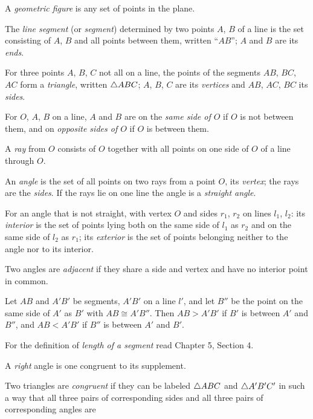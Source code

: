 \documentclass[11pt]{book}
\begin{document}
\begin{applist}
\item A \emph{geometric figure} is any set of points in the plane.
\item The \emph{line segment} (or \emph{segment}) determined by two points
      $A$, $B$ of a line is the set consisting of $A$, $B$ and all points
      between them, written ``$AB$''; $A$ and $B$ are its \emph{ends}.
\item For three points $A$, $B$, $C$ not all on a line, the points of the
      segments $AB$, $BC$, $AC$ form a \emph{triangle}, written
      $\triangle ABC$; $A$, $B$, $C$ are its \emph{vertices} and $AB$, $AC$,
      $BC$ its \emph{sides}.
\item For $O$, $A$, $B$ on a line, $A$ and $B$ are on the \emph{same side of
      $O$} if $O$ is not between them, and on \emph{opposite sides of $O$}
      if $O$ is between them.
\item A \emph{ray} from $O$ consists of $O$ together with all points on one
      side of $O$ of a line through $O$.
\item An \emph{angle} is the set of all points on two rays from a point $O$,
      its \emph{vertex}; the rays are the \emph{sides}. If the rays lie on
      one line the angle is a \emph{straight angle}.
\item For an angle that is not straight, with vertex $O$ and sides $r_1$,
      $r_2$ on lines $l_1$, $l_2$: its \emph{interior} is the set of points
      lying both on the same side of $l_1$ as $r_2$ and on the same side of
      $l_2$ as $r_1$; its \emph{exterior} is the set of points belonging
      neither to the angle nor to its interior.
\item Two angles are \emph{adjacent} if they share a side and vertex and
      have no interior point in common.
\item Let $AB$ and $A'B'$ be segments, $A'B'$ on a line $l'$, and let $B''$
      be the point on the same side of $A'$ as $B'$ with $AB \cong A'B''$.
      Then $AB > A'B'$ if $B'$ is between $A'$ and $B''$, and
      $AB < A'B'$ if $B''$ is between $A'$ and $B'$.
\item For the definition of \emph{length of a segment} read Chapter 5,
      Section 4.
\item A \emph{right} angle is one congruent to its supplement.
\item Two triangles are \emph{congruent} if they can be labeled
      $\triangle ABC$ and $\triangle A'B'C'$ in such a way that all three pairs of
      corresponding sides and all three pairs of corresponding angles are

\end{applist}
\end{document}
